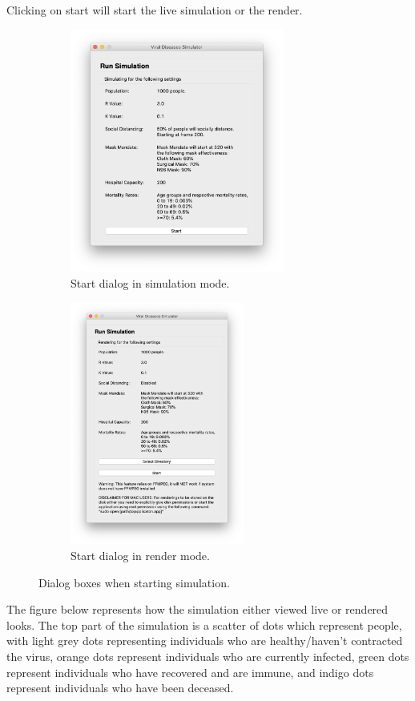 \documentclass[11pt]{article}
\begin{document}
Clicking on start will start the live simulation or the render.
\begin{figure}[H]
    \centering
    \begin{subfigure}[b]{0.4\textwidth}
        \includegraphics[height=8cm]{figures/GUI-start-sim.png}
        \caption{Start dialog in simulation mode.}
    \end{subfigure}
    \begin{subfigure}[b]{0.4\textwidth}
        \includegraphics[height=8cm]{figures/GUI-start-ren.png}
        \caption{Start dialog in render mode.}
    \end{subfigure}
    \caption{Dialog boxes when starting simulation.}
\end{figure}
The figure below represents how the simulation either viewed live or rendered looks. The top part of the simulation is a scatter of dots which represent people, with light grey dots representing individuals who are healthy/haven't contracted the virus, orange dots represent individuals who are currently infected, green dots represent individuals who have recovered and are immune, and indigo dots represent individuals who have been deceased.
\end{document}
